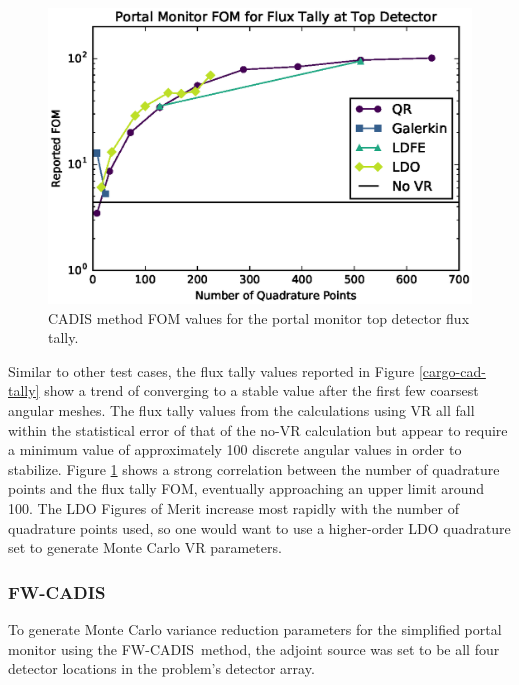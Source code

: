 \documentclass{article} %
\newcommand{\fwc}{\mbox{FW-CADIS}}
\begin{document}
\begin{figure}[!htb]
\centering
\includegraphics[max height=0.445\textheight]{portal-cadis-fom.eps}
\caption{CADIS method FOM values for the portal monitor top detector flux tally.}
\label{cargo-cad-fom}
\end{figure}

Similar to other test cases, the flux tally values reported in Figure 
\ref{cargo-cad-tally} show a trend of converging to a stable value after the
first few coarsest angular meshes. The flux tally values from the
calculations using VR all fall within the statistical error of that of the no-VR
calculation but appear to require a minimum value of approximately 100
discrete angular values in order to stabilize. Figure \ref{cargo-cad-fom}
shows a strong correlation between the number of quadrature points and the
flux tally FOM, eventually approaching an upper limit around 100. The LDO
Figures of Merit increase most rapidly with the number of quadrature points
used, so one would want to use a higher-order LDO quadrature set to generate
Monte Carlo VR parameters.

\FloatBarrier
\subsubsection{\fwc}

To generate Monte Carlo variance reduction parameters for the simplified portal
monitor using the \fwc\ method, the adjoint source was set to be all four
detector locations in the problem's detector array.
\end{document}
